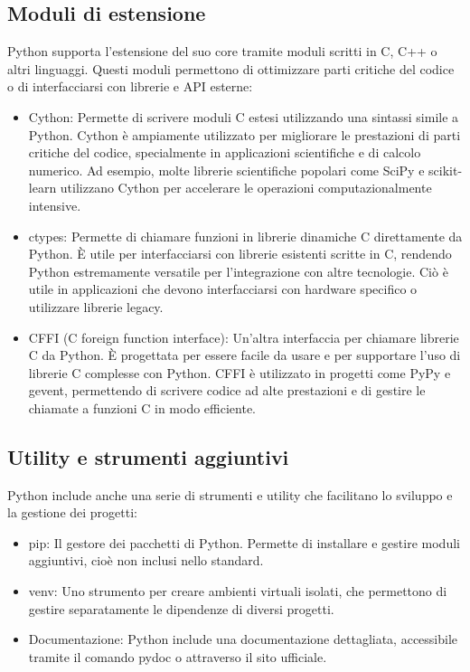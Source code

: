 \documentclass[
  letterpaper,
  DIV=11,
  numbers=noendperiod]{scrreprt}
\providecommand{\tightlist}{%
  \setlength{\itemsep}{0pt}\setlength{\parskip}{0pt}}\usepackage{longtable,booktabs,array}
\begin{document}
\subsection{Moduli di estensione}\label{moduli-di-estensione}

Python supporta l'estensione del suo core tramite moduli scritti in C,
C++ o altri linguaggi. Questi moduli permettono di ottimizzare parti
critiche del codice o di interfacciarsi con librerie e API esterne:

\begin{itemize}
\tightlist
\item
  Cython: Permette di scrivere moduli C estesi utilizzando una sintassi
  simile a Python. Cython è ampiamente utilizzato per migliorare le
  prestazioni di parti critiche del codice, specialmente in applicazioni
  scientifiche e di calcolo numerico. Ad esempio, molte librerie
  scientifiche popolari come SciPy e scikit-learn utilizzano Cython per
  accelerare le operazioni computazionalmente intensive.
\item
  ctypes: Permette di chiamare funzioni in librerie dinamiche C
  direttamente da Python. È utile per interfacciarsi con librerie
  esistenti scritte in C, rendendo Python estremamente versatile per
  l'integrazione con altre tecnologie. Ciò è utile in applicazioni che
  devono interfacciarsi con hardware specifico o utilizzare librerie
  legacy.
\item
  CFFI (C foreign function interface): Un'altra interfaccia per chiamare
  librerie C da Python. È progettata per essere facile da usare e per
  supportare l'uso di librerie C complesse con Python. CFFI è utilizzato
  in progetti come PyPy e gevent, permettendo di scrivere codice ad alte
  prestazioni e di gestire le chiamate a funzioni C in modo efficiente.
\end{itemize}

\subsection{Utility e strumenti
aggiuntivi}\label{utility-e-strumenti-aggiuntivi}

Python include anche una serie di strumenti e utility che facilitano lo
sviluppo e la gestione dei progetti:

\begin{itemize}
\tightlist
\item
  pip: Il gestore dei pacchetti di Python. Permette di installare e
  gestire moduli aggiuntivi, cioè non inclusi nello standard.
\item
  venv: Uno strumento per creare ambienti virtuali isolati, che
  permettono di gestire separatamente le dipendenze di diversi progetti.
\item
  Documentazione: Python include una documentazione dettagliata,
  accessibile tramite il comando pydoc o attraverso il sito ufficiale.
\end{itemize}
\end{document}
